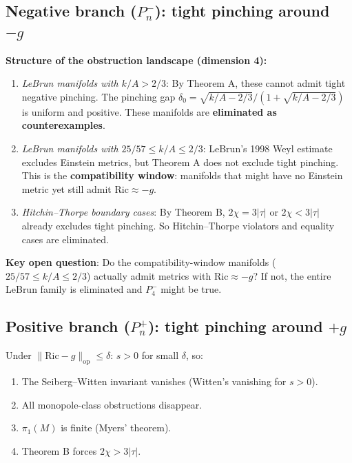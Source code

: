 \subsection{Negative branch ($P_n^-$): tight pinching around $-g$}

\textbf{Structure of the obstruction landscape (dimension 4):}
\begin{enumerate}
\item \textit{LeBrun manifolds with $k/A > 2/3$}: By Theorem A, these cannot admit tight 
      negative pinching. The pinching gap $\delta_0 = \sqrt{k/A - 2/3}/(1 + \sqrt{k/A - 2/3})$
      is uniform and positive. These manifolds are \textbf{eliminated as counterexamples}.

\item \textit{LeBrun manifolds with $25/57 \leq k/A \leq 2/3$}: LeBrun's 1998 Weyl 
      estimate excludes Einstein metrics, but Theorem A does not exclude tight pinching.
      This is the \textbf{compatibility window}: manifolds that might have no Einstein 
      metric yet still admit $\mathrm{Ric} \approx -g$.
      
\item \textit{Hitchin--Thorpe boundary cases}: By Theorem B, $2\chi = 3|\tau|$ or $2\chi < 3|\tau|$
      already excludes tight pinching. So Hitchin--Thorpe violators and equality cases are eliminated.
\end{enumerate}

\textbf{Key open question}: Do the compatibility-window manifolds ($25/57 \leq k/A \leq 2/3$)
actually admit metrics with $\mathrm{Ric} \approx -g$? If not, the entire LeBrun family 
is eliminated and $P_4^-$ might be true.

\subsection{Positive branch ($P_n^+$): tight pinching around $+g$}

Under $\|\mathrm{Ric} - g\|_{\mathrm{op}} \leq \delta$: $s > 0$ for small $\delta$, so:
\begin{enumerate}
\item The Seiberg--Witten invariant vanishes (Witten's vanishing for $s > 0$).
\item All monopole-class obstructions disappear.
\item $\pi_1(M)$ is finite (Myers' theorem).
\item Theorem B forces $2\chi > 3|\tau|$.
\end{enumerate}

